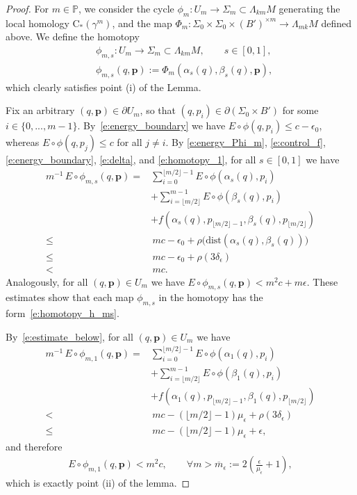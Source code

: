 \documentclass[reqno]{amsart}
\numberwithin{equation}{section}
\theoremstyle{personal}%
\theoremstyle{definition}
\newcommand{\PP}{\mathds{P}}
\newcommand{\dist}{\mathrm{dist}}
\newcommand{\pp}{\bm{p}}
\newcommand{\Loc}{\mathrm{C}}
\begin{document}
\begin{proof}
For $m\in\PP$, we consider the cycle $\phi_m:U_m\to\Sigma_m\subset\Lambda_{km}M$ generating the local homology $\Loc_*(\gamma^m)$, and the map $\Phi_m: \Sigma_0\times \Sigma_0\times (B')^{\times m}\to \Lambda_{mk}M$ defined above. We define the homotopy
\begin{align*}
& \phi_{m,s}:U_m\to\Sigma_m\subset\Lambda_{km}M,
\qquad s\in[0,1],\\
& \phi_{m,s}(q,\pp):=
\Phi_m(\alpha_s(q),\beta_s(q),\pp),
\end{align*}
which clearly satisfies point (i) of the Lemma.


Fix an arbitrary $(q,\pp)\in\partial U_m$, so that $(q,p_i)\in\partial(\Sigma_0\times B')$ for some $i\in\{0,...,m-1\}$. By~\eqref{e:energy_boundary} we have
$E\circ\phi(q,p_i)\leq c-\epsilon_0$,
whereas $E\circ\phi(q,p_j)\leq c$ for all $j\neq i$.
By \eqref{e:energy_Phi_m}, \eqref{e:control_f}, \eqref{e:energy_boundary}, \eqref{e:delta}, and \eqref{e:homotopy_1}, for all $s\in[0,1]$ we have
\begin{align*}
 m^{-1}\,E\circ \phi_{m,s}(q,\pp) = & \sum_{i=0}^{\lfloor m/2\rfloor-1}E\circ\phi(\alpha_s(q),p_i) \\  
 & 
 +\sum_{i=\lfloor m/2\rfloor}^{m-1}E\circ\phi(\beta_s(q),p_i) \\
 & + 
f(\alpha_s(q),p_{\lfloor m/2\rfloor-1},\beta_s(q),p_{\lfloor m/2\rfloor})\\
\leq &\, mc-\epsilon_0 + \rho\big(\dist(\alpha_s(q),\beta_s(q))\big)\\
\leq &\, mc-\epsilon_0 + \rho(3\delta_\epsilon)\\
< &\, mc.
\end{align*}
Analogously, for all $(q,\pp)\in U_m$ we have
$ E\circ \phi_{m,s}(q,\pp) < m^2c+m\epsilon$.
These estimates show that each map $\phi_{m,s}$ in the homotopy has the form~\eqref{e:homotopy_h_ms}.

By~\eqref{e:estimate_below}, for all $(q,\pp)\in U_m$ we have
\begin{align*}
 m^{-1}\,E\circ \phi_{m,1}(q,\pp) = & \sum_{i=0}^{\lfloor m/2\rfloor-1}E\circ\phi(\alpha_1(q),p_i) \\  
 & 
 +\sum_{i=\lfloor m/2\rfloor}^{m-1}E\circ\phi(\beta_1(q),p_i) \\
 & + 
f(\alpha_1(q),p_{\lfloor m/2\rfloor-1},\beta_1(q),p_{\lfloor m/2\rfloor})\\
< &\, mc-(\lfloor m/2\rfloor-1)\mu_\epsilon + \rho(3\delta_\epsilon)\\
\leq &\, mc-(\lfloor m/2\rfloor-1)\mu_\epsilon + \epsilon,
\end{align*}
and therefore
\begin{align*}
 E\circ \phi_{m,1}(q,\pp) < m^2c,
 \qquad
 \forall m > \overline m_\epsilon:=2\left(\frac{\epsilon}{\mu_\epsilon}+1\right),
\end{align*}
which is exactly point (ii) of the lemma.
\end{proof}
\end{document}
